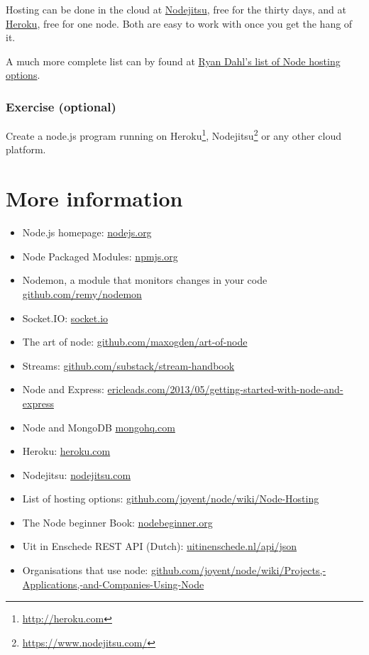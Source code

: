 \documentclass[a4paper]{report}
\begin{document}
Hosting can be done in the cloud at \href{https://www.nodejitsu.com/}{Nodejitsu}, free for the thirty days, and at \href{https://www.heroku.com/}{Heroku}, free for one node. Both are easy to work with once you get the hang of it.

A much more complete list can by found at \href{https://github.com/joyent/node/wiki/Node-Hosting}{Ryan Dahl's list of Node hosting options}.

\subsubsection*{Exercise (optional)}
Create a node.js program running on Heroku\footnote{\url{http://heroku.com}}, Nodejitsu\footnote{\url{https://www.nodejitsu.com/}} or any other cloud platform.

\section*{More information}
\begin{itemize}
	\item Node.js homepage: \href{http://nodejs.org}{nodejs.org}
	\item Node Packaged Modules: \href{https://npmjs.org/}{npmjs.org}
	\item Nodemon, a module that monitors changes in your code \href{https://github.com/remy/nodemon}{github.com/remy/nodemon}
	\item Socket.IO: \href{http://socket.io/}{socket.io}
	\item The art of node: \href{https://github.com/maxogden/art-of-node}{github.com/maxogden/art-of-node}
	\item Streams: \href{https://github.com/substack/stream-handbook}{github.com/substack/stream-handbook}
	\item Node and Express: \href{http://ericleads.com/2013/05/getting-started-with-node-and-express/}{ericleads.com/2013/05/getting-started-with-node-and-express}
	\item Node and MongoDB \href{http://blog.mongohq.com/node-js-mongodb-and-you-an-intro-in-parts/}{mongohq.com}
	\item Heroku: \href{https://www.heroku.com/}{heroku.com}
	\item Nodejitsu: \href{https://www.nodejitsu.com/}{nodejitsu.com}
	\item List of hosting options: \href{https://github.com/joyent/node/wiki/Node-Hosting}{github.com/joyent/node/wiki/Node-Hosting}
	\item The Node beginner Book: \href{http://www.nodebeginner.org/}{nodebeginner.org}
	\item Uit in Enschede REST API (Dutch): \href{http://www.uitinenschede.nl/api/json/?page=index}{uitinenschede.nl/api/json}
	\item Organisations that use node: \href{https://github.com/joyent/node/wiki/Projects,-Applications,-and-Companies-Using-Node}{github.com/joyent/node/wiki/Projects,-Applications,-and-Companies-Using-Node}
\end{itemize}

\end{document}
